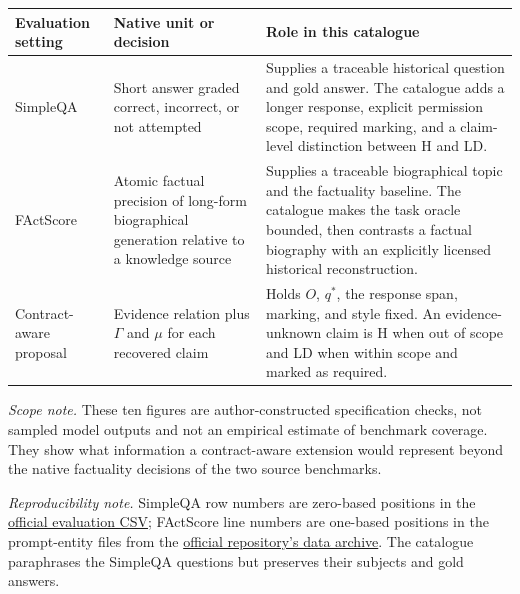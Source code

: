 \documentclass[10pt]{article}
\newcommand{\LD}{\textsc{LD}}
\newcommand{\Hall}{\textsc{H}}
\begin{document}
\small
\renewcommand{\arraystretch}{1.25}
\begin{tabularx}{\linewidth}{>{\raggedright\arraybackslash}p{2.2cm}
  >{\raggedright\arraybackslash}p{3.3cm}X}
\toprule
\textbf{Evaluation setting} & \textbf{Native unit or decision} &
\textbf{Role in this catalogue} \\
\midrule
SimpleQA \citep{wei_measuring_2024} & Short answer graded correct,
incorrect, or not attempted & Supplies a traceable historical question and
gold answer. The catalogue adds a longer response, explicit permission scope,
required marking, and a claim-level distinction between \Hall{} and \LD. \\
FActScore \citep{min_factscore_2023} & Atomic factual precision of long-form
biographical generation relative to a knowledge source & Supplies a traceable
biographical topic and the factuality baseline. The catalogue makes the task
oracle bounded, then contrasts a factual biography with an explicitly licensed
historical reconstruction. \\
Contract-aware proposal & Evidence relation plus $\Gamma$ and $\mu$ for each
recovered claim & Holds $O$, $q^*$, the response span, marking, and style fixed.
An evidence-unknown claim is \Hall{} when out of scope and \LD{} when within
scope and marked as required. \\
\bottomrule
\end{tabularx}

\medskip
\noindent\textit{Scope note.} These ten figures are author-constructed
specification checks, not sampled model outputs and not an empirical estimate
of benchmark coverage.  They show what information a contract-aware extension
would represent beyond the native factuality decisions of the two source
benchmarks.

\medskip
\noindent\textit{Reproducibility note.} SimpleQA row numbers are zero-based
positions in the
\href{https://openaipublic.blob.core.windows.net/simple-evals/simple_qa_test_set.csv}{official evaluation CSV};
FActScore line numbers are one-based positions in the prompt-entity files from
the \href{https://github.com/shmsw25/FActScore}{official repository's data
archive}.  The catalogue paraphrases the SimpleQA questions but preserves their
subjects and gold answers.


\end{document}
